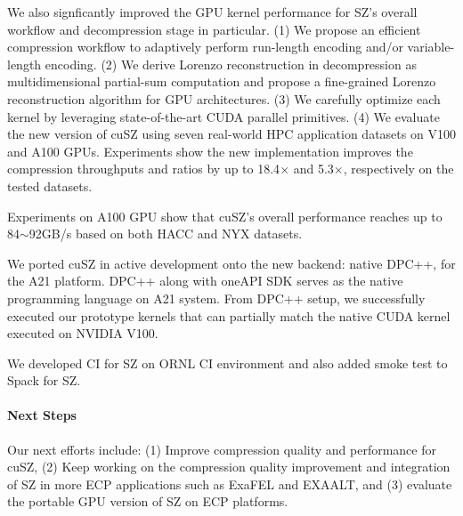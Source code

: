 We also signficantly improved the GPU kernel performance for SZ's overall workflow and decompression stage in particular. (1) We propose an efficient compression workflow to adaptively perform run-length encoding and/or variable-length encoding. (2) We derive Lorenzo reconstruction in decompression as multidimensional partial-sum computation and propose a fine-grained Lorenzo reconstruction algorithm for GPU architectures. (3) We carefully optimize each kernel by leveraging state-of-the-art CUDA parallel primitives. (4) We evaluate the new version of cuSZ using seven real-world HPC application datasets on V100 and A100 GPUs. Experiments show the new implementation improves the compression throughputs and ratios by up to 18.4$\times$ and 5.3$\times$, respectively on the tested datasets.

Experiments on A100 GPU show that cuSZ's overall performance reaches up to 84$\sim$92GB/s based on both HACC and NYX datasets.

We ported cuSZ in active development onto the new backend: native DPC++, for the A21 platform. 
DPC++ along with oneAPI SDK serves as the native programming language on A21 system. From DPC++ setup, we successfully executed our prototype kernels that can partially match the native CUDA kernel executed on NVIDIA V100.

We developed CI for SZ on ORNL CI environment and also added smoke test to Spack for SZ. 

\paragraph{Next Steps} Our next efforts include: (1) Improve compression quality and performance for cuSZ, (2) Keep working on the compression quality improvement and integration of SZ in more ECP applications such as ExaFEL and EXAALT, and (3) evaluate the portable GPU version of SZ on ECP platforms.


